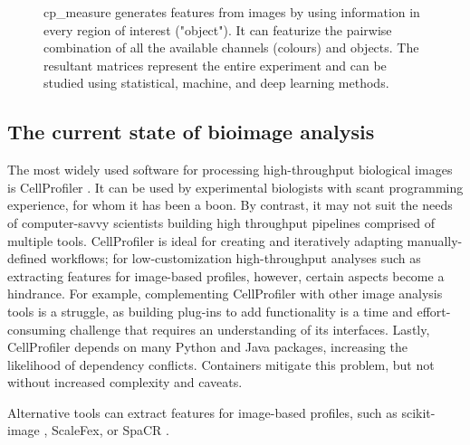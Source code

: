 \documentclass{article}
\begin{document}
\begin{figure}[htbp]
\centering

\caption{\label{fig:overview}cp\_measure generates features from images by using information in every region of interest ("object"). It can featurize the pairwise combination of all the available channels (colours) and objects. The resultant matrices represent the entire experiment and can be studied using statistical, machine, and deep learning methods.}
\end{figure}

\subsection{The current state of bioimage analysis}
\label{sec:org8f5b33d}
The most widely used software for processing high-throughput biological images is CellProfiler \citep{stirlingCellProfiler4Improvements2021}. It can be used by experimental biologists with scant programming experience, for whom it has been a boon. By contrast, it may not suit the needs of computer-savvy scientists building high throughput pipelines comprised of multiple tools. CellProfiler is ideal for creating and iteratively adapting manually-defined workflows; for low-customization high-throughput analyses such as extracting features for image-based profiles, however, certain aspects become a hindrance. For example, complementing CellProfiler with other image analysis tools is a struggle, as building plug-ins to add functionality is a time and effort-consuming challenge that requires an understanding of its interfaces. Lastly, CellProfiler depends on many Python and Java packages, increasing the likelihood of dependency conflicts. Containers mitigate this problem, but not without increased complexity and caveats.

Alternative tools can extract features for image-based profiles, such as scikit-image \citep{waltScikitimageImageProcessing2014}, ScaleFex, or SpaCR \citep{comoletHighlyEfficientScalable2024,einarolafssonSpaCr2025}. 
\end{document}
